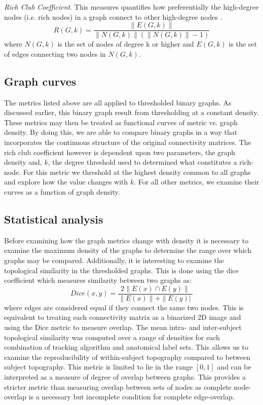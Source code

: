 \documentclass{frontiersSCNS} %
\begin{document}
\emph{Rich Club Coefficient}.
This measures quantifies how preferentially the high-degree nodes (i.e. rich nodes)  in a graph connect to other high-degree nodes \citep{Colizza2006}.
$$ R(G,k) = \frac{ \|E(G,k)\| }{ \|N(G,k)\| ( \|N(G,k)\|-1 ) } $$
where $N(G,k)$ is the set of nodes of degree k or higher and $E(G,k)$ is the set of edges connecting two nodes in $N(G,k)$.


\subsection{Graph curves}
The metrics listed above are all applied to thresholded binary graphs. As discussed earlier, this binary graph result from thresholding at a constant density. These metrics may then be treated as functional curves of metric vs. graph density. By doing this, we are able to compare binary graphs in a way that incorporates the continuous structure of the original connectivity matrices. The rich club coefficient however is dependent upon two parameters, the graph density and, $k$, the degree threshold used to determined what constitutes a rich-node. For this metric we threshold at the highest density common to all graphs and explore how the value changes with $k$. For all other metrics, we examine their curves as a function of graph density. 

\subsection{Statistical analysis}
Before examining how the graph metrics change with density it is necessary to examine the maximum density of the graphs to determine the range over which graphs may be compared. Additionally, it is interesting to examine the topological similarity in the thresholded graphs. This is done using the dice coefficient which measures similarity between two graphs as:
$$Dice(x,y) = \frac{ 2 \| E(x) \cap E(y) \| }{ \|E(x) \| + \| E(y) |\ }$$
where edges are considered equal if they connect the same two
nodes. This is equivalent to treating each connectivity matrix as
a binarized 2D image and using the Dice metric to measure overlap. The mean intra- and inter-subject topological similarity 
was computed over a range of densities for each combination of tracking algorithm and anatomical label sets. This allows us to 
examine the reproducibility of within-subject topography compared to between subject topography. This metric is limited to lie in the range $[0,1]$ and can be interpreted as a measure of degree of overlap between graphs. This provides a stricter metric than measuring overlap between sets of nodes as complete node-overlap is a necessary but incomplete condition for complete edge-overlap.
\end{document}
